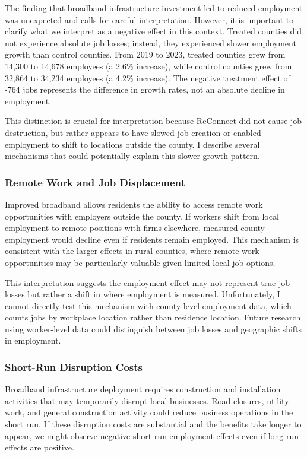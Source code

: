 \documentclass[12pt]{article}
\begin{document}
The finding that broadband infrastructure investment led to reduced employment was unexpected and calls for careful interpretation. However, it is important to clarify what we interpret as a negative effect in this context. Treated counties did not experience absolute job losses; instead, they experienced slower employment growth than control counties. From 2019 to 2023, treated counties grew from 14,300 to 14,678 employees (a 2.6\% increase), while control counties grew from 32,864 to 34,234 employees (a 4.2\% increase). The negative treatment effect of -764 jobs represents the difference in growth rates, not an absolute decline in employment.

This distinction is crucial for interpretation because ReConnect did not cause job destruction, but rather appears to have slowed job creation or enabled employment to shift to locations outside the county. I describe several mechanisms that could potentially explain this slower growth pattern.

\subsubsection{Remote Work and Job Displacement}

Improved broadband allows residents the ability to access remote work opportunities with employers outside the county. If workers shift from local employment to remote positions with firms elsewhere, measured county employment would decline even if residents remain employed. This mechanism is consistent with the larger effects in rural counties, where remote work opportunities may be particularly valuable given limited local job options.

This interpretation suggests the employment effect may not represent true job losses but rather a shift in where employment is measured. Unfortunately, I cannot directly test this mechanism with county-level employment data, which counts jobs by workplace location rather than residence location. Future research using worker-level data could distinguish between job losses and geographic shifts in employment.

\subsubsection{Short-Run Disruption Costs}

Broadband infrastructure deployment requires construction and installation activities that may temporarily disrupt local businesses. Road closures, utility work, and general construction activity could reduce business operations in the short run. If these disruption costs are substantial and the benefits take longer to appear, we might observe negative short-run employment effects even if long-run effects are positive.
\end{document}
